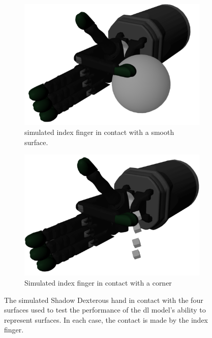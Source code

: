 \begin{figure}[h]
\begin{subfigure}[b]{0.24\textwidth}
	\end{subfigure}
	\hfill
	\begin{subfigure}[b]{0.24\textwidth}
		\centering
		\includegraphics[width=\textwidth]{chapters/1-tactile-perception/fig/screen-shots/smooth-contact.png}
		\caption{simulated index finger in contact with a smooth surface.}
		\label{fig:smooth-contact-experimental}
	\end{subfigure}
	\hfill
	\begin{subfigure}[b]{0.24\textwidth}
		\centering
		\includegraphics[width=\textwidth]{chapters/1-tactile-perception/fig/screen-shots/corner-contact.png}
		\caption{Simulated index finger in contact with a corner}
		\label{fig:corner-contact-experimental}
	\end{subfigure}
		\caption{The simulated Shadow Dexterous hand in contact with the four surfaces used to test the performance of the \gls{dl} model's ability to represent surfaces. In each case, the contact is made by the index finger.}
		\label{fig:experimental-setup-tactile-perception-experimental}
\end{figure}

